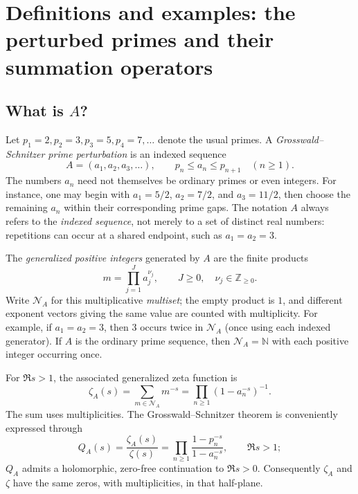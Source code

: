 \documentclass[12pt,letterpaper]{article}
\numberwithin{equation}{section}
\theoremstyle{remark}
\begin{document}
\section[Prime perturbations and summation operators]{Definitions and examples: the perturbed primes and their summation operators}
\label{sec:definitions}

\subsection[The perturbed sequence]{What is $A$?}
Let $p_1=2,p_2=3,p_3=5,p_4=7,\ldots$ denote the usual primes.
A \emph{Grosswald--Schnitzer prime perturbation} is an indexed sequence
\begin{equation}\label{eq:Aprimes}
 A=(a_1,a_2,a_3,\ldots),\qquad p_n\le a_n\le p_{n+1}\quad(n\ge1).
\end{equation}
The numbers $a_n$ need not themselves be ordinary primes or even integers.
For instance, one may begin with $a_1=5/2$, $a_2=7/2$, and
$a_3=11/2$, then choose the remaining $a_n$ within their corresponding
prime gaps.  The notation $A$ always refers to the \emph{indexed
sequence}, not merely to a set of distinct real numbers: repetitions
can occur at a shared endpoint, such as $a_1=a_2=3$.

The \emph{generalized positive integers} generated by $A$ are the
finite products
\begin{equation}\label{eq:generalizedintegers}
 m=\prod_{j=1}^J a_j^{\nu_j},\qquad J\ge0,\quad \nu_j\in\mathbb Z_{\ge0}.
\end{equation}
Write $\mathcal N_A$ for this multiplicative \emph{multiset}; the empty
product is $1$, and different exponent vectors giving the same value
are counted with multiplicity.  For example, if $a_1=a_2=3$, then
$3$ occurs twice in $\mathcal N_A$ (once using each indexed generator).
If $A$ is the ordinary prime sequence, then $\mathcal N_A=\mathbb N$
with each positive integer occurring once.

For $\Re s>1$, the associated generalized zeta function is
\begin{equation}\label{eq:generalizedzeta}
 \zeta_A(s)=\sum_{m\in\mathcal N_A}m^{-s}
 =\prod_{n\ge1}(1-a_n^{-s})^{-1}.
\end{equation}
The sum uses multiplicities.  The Grosswald--Schnitzer theorem is
conveniently expressed through
\begin{equation}\label{eq:Qdefagain}
 Q_A(s)=\frac{\zeta_A(s)}{\zeta(s)}
 =\prod_{n\ge1}\frac{1-p_n^{-s}}{1-a_n^{-s}},\qquad \Re s>1;
\end{equation}
$Q_A$ admits a holomorphic, zero-free continuation to $\Re s>0$.
Consequently $\zeta_A$ and $\zeta$ have the same zeros, with
multiplicities, in that half-plane.
\end{document}
